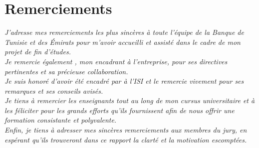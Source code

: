 \chapter*{\huge Remerciements}

\begin{center}
\it \Large
J’adresse mes remerciements les plus sincères à toute l’équipe de la Banque de Tunisie et des Émirats pour m’avoir accueilli et assisté dans le cadre de mon projet de fin d’études.\\
\vskip12mm
Je remercie également \textbf{\@proFramerName}, mon encadrant à l’entreprise, pour ses directives pertinentes et sa précieuse collaboration.\\
\vskip12mm
Je suis honoré d’avoir été encadré par \textbf{\@academicFramerName} à l’ISI et le remercie vivement pour ses remarques et ses conseils avisés.\\
\vskip12mm
Je tiens à remercier les enseignants tout au long de mon cursus universitaire et à les féliciter pour les grands efforts qu’ils fournissent afin de nous offrir une formation consistante et polyvalente.\\
\vskip12mm
Enfin, je tiens à adresser mes sincères remerciements aux membres du jury, en espérant qu’ils trouveront dans ce rapport la clarté et la motivation escomptées.
\end{center}